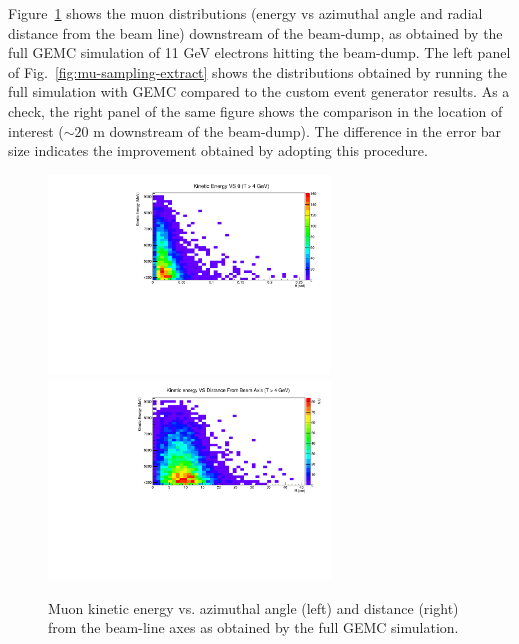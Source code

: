Figure~\ref{fig:mu-sampling} shows the muon distributions (energy vs azimuthal angle and radial distance from the beam line) downstream of the beam-dump, as obtained by the full GEMC simulation of  11 GeV electrons hitting the beam-dump.
The left panel of Fig.~\ref{fig:mu-sampling-extract} shows the  distributions obtained by running the full simulation with GEMC compared to  the custom event generator results. 
As a check, the right panel of the same figure  shows the  comparison in the location of interest ($\sim 20$ m downstream of the beam-dump).
The difference in the error bar size indicates the improvement obtained by adopting this procedure.
\begin{figure}[h!] 
\center
\includegraphics[width=7.5cm]{figs/EkinVStheta.pdf}
\includegraphics[width=7.5cm]{figs/EkinVSR.pdf}
\caption{Muon kinetic energy vs. azimuthal angle (left) and distance (right) from the beam-line axes as obtained by the full GEMC simulation.}
\label{fig:mu-sampling}
\end{figure}

